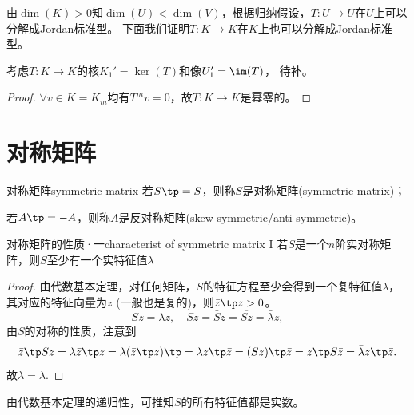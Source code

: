 \begin{corollary}
	由$\dim(K)>0$知$\dim(U)<\dim(V)$，根据归纳假设，$T:U\to U$在$U$上可以分解成Jordan标准型。
	下面我们证明$T:K\to K$在$K$上也可以分解成Jordan标准型。
\end{corollary}

\begin{theorem}
	{}{}
	考虑$T:K\to K$的核$K_1'=\ker(T)$和像$U_1'=\im(T)$，
	待补。
\end{theorem}

\begin{proof}
	$\forall v\in K=K_m$均有$T^mv=0$，故$T:K\to K$是幂零的。
\end{proof}

\section{对称矩阵}

\begin{definition}
	{对称矩阵}{symmetric matrix}
	若$S\tp=S$，则称$S$是对称矩阵(symmetric matrix)；
	
	若$A\tp=-A$，则称$A$是反对称矩阵(skew-symmetric/anti-symmetric)。
\end{definition}
\begin{theorem}{对称矩阵的性质·一}{characterist of symmetric matrix I}
	若$S$是一个$n$阶实对称矩阵，则$S$至少有一个实特征值$\lambda$
\end{theorem}
\begin{proof}
	由代数基本定理，对任何矩阵，$S$的特征方程至少会得到一个复特征值$\lambda$，其对应的特征向量为$z$ (一般也是复的)，则$\bar z\tp z>0$。
	\[
		Sz=\lambda z,\quad S\bar z=\bar S\bar z=\overline{Sz}=\bar\lambda\bar z,
	\]
	由$S$的对称的性质，注意到
	\[
		\bar z\tp Sz=\lambda\bar z\tp z=\lambda(\bar z\tp z)\tp=\lambda z\tp\bar z=(Sz)\tp\bar z=z\tp S\bar z=\bar\lambda z\tp\bar z.
	\]
	故$\lambda=\bar\lambda$.
\end{proof}

\begin{corollary}
	由代数基本定理的递归性，可推知$S$的所有特征值都是实数。
\end{corollary}

